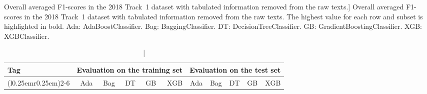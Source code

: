 \begingroup

\setlength\tabcolsep{4.05pt}

\newcommand{\minorfootnotesize}{\fontsize{9.2pt}{11.04pt}\selectfont}

\begin{table}[!t]

\caption%
[Overall averaged F1-scores in the 2018  Track~1 dataset with tabulated information removed from the raw texts.]%
{Overall averaged F1-scores in the 2018  Track~1 dataset with tabulated information removed from the raw texts. The highest value for each row and subset is highlighted in bold. Ada: \textsf{AdaBoostClassifier}. Bag: \textsf{BaggingClassifier}. DT: \textsf{DecisionTreeClassifier}. GB: \textsf{GradientBoostingClassifier}. XGB: \textsf{XGBClassifier}.}
\label{tab:2018-n2c2-results-notabular}

\centering

\minorfootnotesize

\begin{tabular}{lrrrrrrrrrr}

\toprule

Tag & \multicolumn{5}{l}{Evaluation on the training set} & \multicolumn{5}{l}{Evaluation on the test set}\\

\cmidrule(r{0.25em}){1-1}\cmidrule(l{0.25em}r{0.25em}){2-6}\cmidrule(l{0.25em}){7-11}

& Ada & Bag & DT & GB & XGB & Ada & Bag & DT & GB & XGB\\


\end{tabular}
\end{table}
